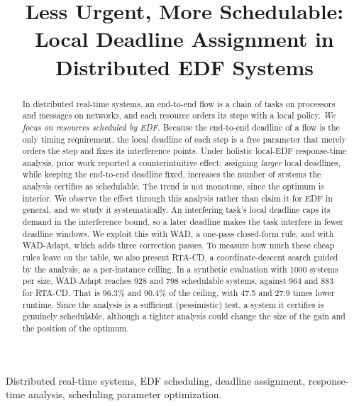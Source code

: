 \documentclass[conference]{IEEEtran}
\begin{document}
\title{Less Urgent, More Schedulable:\\ Local Deadline Assignment in Distributed EDF Systems}

\author{
}

\maketitle

\begin{abstract}
In distributed real-time systems, an end-to-end flow is a chain of tasks on
processors and messages on networks, and each resource orders its steps with a
local policy. \emph{We focus on resources scheduled by EDF.} Because the
end-to-end deadline of a flow is the only timing requirement, the local deadline
of each step is a free parameter that merely orders the step and fixes its
interference points.
Under holistic local-EDF response-time analysis, prior work reported a counterintuitive effect: assigning \emph{larger} local deadlines,
while keeping the end-to-end deadline fixed, increases the number of systems the
analysis certifies as schedulable. The trend is not monotone, since the optimum
is interior. We observe the effect through this analysis rather than claim it for EDF in
general, and we study it systematically. An interfering task's local deadline
caps its demand in the interference bound, so a later deadline makes the task
interfere in fewer deadline windows. We exploit
this with WAD, a one-pass closed-form rule, and with WAD-Adapt, which adds three
correction passes. To measure how much these cheap rules leave on the table, we
also present RTA-CD, a coordinate-descent search guided by the analysis, as a
per-instance ceiling. In a synthetic evaluation with 1000 systems per size,
WAD-Adapt reaches 928 and 798 schedulable systems, against 964 and 883 for
RTA-CD. That is 96.3\% and 90.4\% of the ceiling, with 47.5 and 27.9 times
lower runtime. Since the analysis is a sufficient (pessimistic) test, a system it
certifies is genuinely schedulable, although a tighter analysis could change the
size of the gain and the position of the optimum.
\end{abstract}

\begin{IEEEkeywords}
Distributed real-time systems, EDF scheduling, deadline assignment,
response-time analysis, scheduling parameter optimization.
\end{IEEEkeywords}
\end{document}
